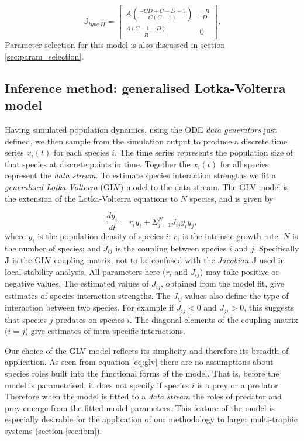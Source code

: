\begin{equation}\label{eq:jac2}
\mathbb{J}_{type\ II} = 
\begin{bmatrix}
A\left(\frac{-CD +C -D + 1}{C(C-1)}\right) & \frac{-B}{D} \\[10pt] \frac{A(C-1-D)}{B} & 0
\end{bmatrix}  	.
\end{equation}
%
Parameter selection for this model is also discussed in section \ref{sec:param_selection}. 


\subsection{Inference method: generalised Lotka-Volterra model}
\label{sec:def_GLV}

Having simulated population dynamics, using the ODE \emph{data generators} just defined, we then sample from the simulation output to produce a discrete time series $x_i(t)$ for each species $i$. The time series represents the population size of that species at discrete points in time. Together the $x_i(t)$ for all species represent the \emph{data stream}. To estimate species interaction strengths we fit a \emph{generalised Lotka-Volterra} (GLV) model to the data stream. The GLV model is the extension of the Lotka-Volterra equations to $N$ species, and is given by

\begin{equation}
\frac{dy_i}{dt} = r_iy_i + \Sigma_{j=1}^N J_{ij}y_iy_j,
\label{eq:glv}
\end{equation}
%
where $y_i$ is the population density of species $i$; $r_i$ is the intrinsic growth rate; $N$ is the number of species; and $J_{ij}$ is the coupling between species $i$ and $j$. Specifically $\mathbf{J}$ is the GLV coupling matrix, not to be confused with the \emph{Jacobian} $\mathbb{J}$ used in local stability analysis. All parameters here ($r_i$ and $J_{ij}$) may take positive or negative values. The estimated values of $J_{ij}$, obtained from the model fit, give estimates of species interaction strengths. The $J_{ij}$ values also define the type of interaction between two species. For example if $J_{ij} < 0$ and $J_{ji} > 0$, this suggests that species $j$ predates on species $i$. The diagonal elements of the coupling matrix ($i=j$) give estimates of intra-specific interactions.

Our choice of the GLV model reflects its simplicity and therefore its breadth of application. As seen from equation \eqref{eq:glv} there are no assumptions about species roles built into the functional forms of the model. That is, before the model is parametrised, it does not specify if species $i$ is a prey or a predator. Therefore when the model is fitted to a \emph{data stream} the roles of predator and prey emerge from the fitted model parameters. This feature of the model is especially desirable for the application of our methodology to larger multi-trophic systems (section \ref{sec:ibm}). 

